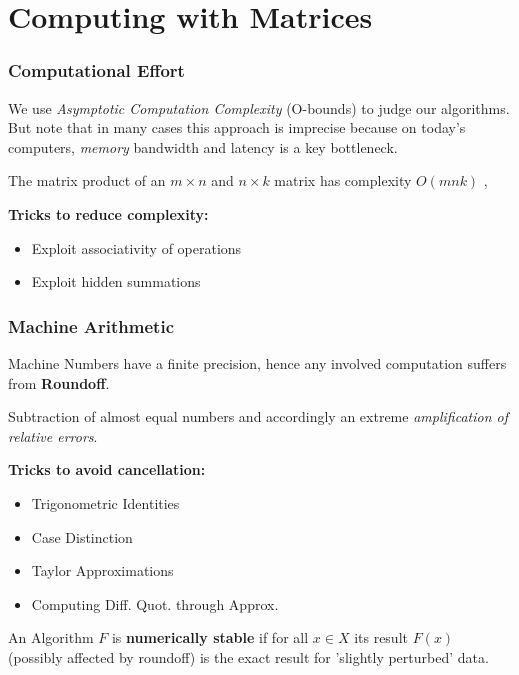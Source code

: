 \part{Computing with Matrices}
\setcounter{section}{0}

\section{Computational Effort}
We use \textit{Asymptotic Computation Complexity} (O-bounds) to judge our algorithms. But note that in many cases this approach is imprecise because on today's computers, \textit{memory} bandwidth and latency is a key bottleneck. 

 The matrix product of an $m \times n$ and $n \times k$ matrix has complexity $O(mnk)$
\sep

\textbf{Tricks to reduce complexity:}
\begin{itemize}
  \item Exploit associativity of operations
  \item Exploit hidden summations
\end{itemize}


\section{Machine Arithmetic}
Machine Numbers have a finite precision, hence any involved computation suffers from \textbf{Roundoff}. 

\Def[Cancellation] Subtraction of almost equal numbers and accordingly an extreme \textit{amplification of relative errors}.

\textbf{Tricks to avoid cancellation:}
\begin{itemize}
  \item Trigonometric Identities
  \item Case Distinction
  \item Taylor Approximations
  \item Computing Diff. Quot. through Approx.
\end{itemize}

\Def[Stability] An Algorithm $F$ is \textbf{numerically stable} if for all $x\in X$ its result $F(x)$ (possibly affected by roundoff) is the exact result for 'slightly perturbed' data. 

